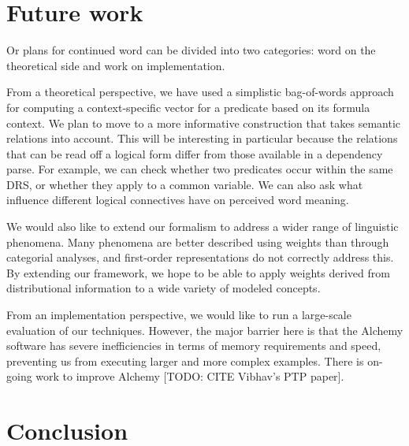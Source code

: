 \section{Future work}

Or plans for continued word can be divided into two categories: word on the
theoretical side and work on implementation.

From a theoretical perspective, we have used a simplistic bag-of-words
approach for
computing a context-specific vector for a predicate based on its
formula context. We plan to move to a more informative construction
that takes semantic relations into account. This will be interesting in particular because the relations that can be read off a logical
form differ from those available in a dependency parse. For example,
we can check whether two predicates occur within the same DRS, or
whether they apply to a common variable. We can also ask what 
influence different logical connectives have on perceived word meaning. 


We would also like to extend our formalism to address
a wider range of linguistic phenomena.  Many phenomena are better
described using weights than through categorial analyses, and first-order representations do not correctly
address this.  By extending our framework, we hope to be able to
apply weights derived from distributional information to a wide variety of
modeled concepts.



From an implementation perspective, we would like to %
run a large-scale
evaluation of our techniques.  
However, the major barrier here is that the Alchemy software has severe
inefficiencies in terms of memory requirements and speed, preventing us
from executing larger and more complex examples.  There is on-going
work to improve Alchemy [TODO: CITE Vibhav's PTP paper].



\section{Conclusion}

